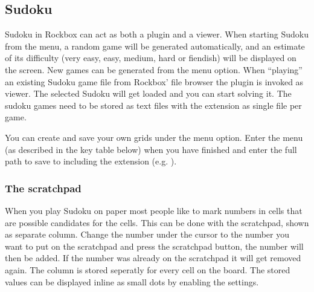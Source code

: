 \subsection{\label{ref:Sudoku}Sudoku}
Sudoku in Rockbox can act as both a plugin and a viewer.
When starting Sudoku from the  menu, a 
random game will be generated automatically, and an estimate of its difficulty
(very easy, easy, medium, hard or fiendish) will be displayed on the screen.
New games can be generated from the  menu option.
When ``playing'' an existing Sudoku game file from Rockbox' file browser
the plugin is invoked as viewer. The selected Sudoku will get loaded and you
can start solving it. The sudoku games need to be stored as text
files with the extension  as single file per game.

You can create and save your own grids under the  menu option.
Enter the menu (as described in the key table below) when you have finished and
enter the full path to save to including the  extension 
(e.g. ).

\subsubsection{The scratchpad}
When you play Sudoku on paper most people like to mark numbers in cells that 
are possible candidates for the cells.
This can be done with the scratchpad, shown as separate column.
Change the number under the cursor to the number you want to put on the
scratchpad and press the scratchpad button, the number will then be added.
If the number was already on the scratchpad it will get removed again.
The column is stored seperatly for every cell on the board. The stored values
can be displayed inline as small dots by enabling the 
settings.

